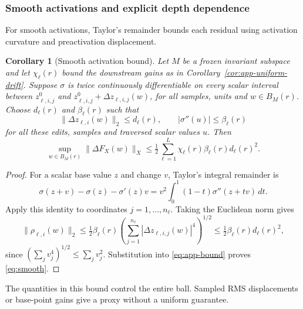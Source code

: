 \documentclass[twoside]{article}
\newtheorem{corollary}[theorem]{Corollary}
\theoremstyle{remark}
\theoremstyle{highlightdefinition}
\theoremstyle{remark}
\begin{document}
\subsubsection{Smooth activations and explicit depth dependence}
For smooth activations, Taylor's remainder bounds each residual using activation curvature and preactivation displacement.
\begin{corollary}[Smooth activation bound]\label{cor:app-smooth-bound}
Let $M$ be a frozen invariant subspace and let $\chi_\ell(r)$ bound the downstream gains as in Corollary~\ref{cor:app-uniform-drift}. Suppose $\sigma$ is twice continuously differentiable on every scalar interval between $z_{\ell,i,j}^0$ and $z_{\ell,i,j}^0+\Delta z_{\ell,i,j}(w)$, for all samples, units and $w\in B_M(r)$. Choose $d_\ell(r)$ and $\beta_\ell(r)$ such that
\[
 \|\Delta z_{\ell,i}(w)\|_2\le d_\ell(r),\qquad
 |\sigma''(u)|\le\beta_\ell(r)
\]
for all these edits, samples and traversed scalar values $u$. Then
\begin{equation}
 \sup_{w\in B_M(r)}\|\Delta F_X(w)\|_X
 \le\tfrac12\sum_{\ell=1}^L \chi_\ell(r)\beta_\ell(r)d_\ell(r)^2.
 \label{eq:smooth}
\end{equation}
\end{corollary}
\begin{proof}
For a scalar base value $z$ and change $v$, Taylor's integral remainder is
\[
 \sigma(z+v)-\sigma(z)-\sigma'(z)v
       =v^2\int_0^1(1-t)\sigma''(z+tv)\,dt.
\]
Apply this identity to coordinates $j=1,\ldots,n_\ell$. Taking the Euclidean norm gives
\[
 \|\rho_{\ell,i}(w)\|_2
 \le\tfrac12\beta_\ell(r)\left(\sum_{j=1}^{n_\ell}|\Delta z_{\ell,i,j}(w)|^4\right)^{1/2}
 \le\tfrac12\beta_\ell(r)d_\ell(r)^2,
\]
since $(\sum_j v_j^4)^{1/2}\le\sum_jv_j^2$. Substitution into \eqref{eq:app-bound} proves \eqref{eq:smooth}.
\end{proof}
The quantities in this bound control the entire ball. Sampled RMS displacements or base-point gains give a proxy without a uniform guarantee.
\end{document}
